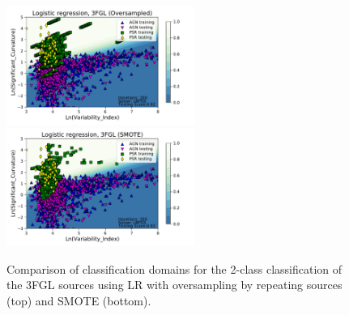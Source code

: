 \begin{figure}[h]
\centering
\includegraphics[width=0.55\textwidth]{plots/classification_domains/domains_oversampled_LR_3FGL_2class.pdf}
\includegraphics[width=0.55\textwidth]{plots/classification_domains/domains_smote_LR_3FGL_2class.pdf}
\caption{Comparison of classification domains for the 2-class classification of the 3FGL sources
using LR with oversampling by repeating sources (top) and SMOTE (bottom).
}
\label{fig:domains_smote_over}
\end{figure}

